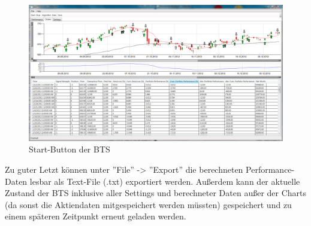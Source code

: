 \begin{figure}[H]
\centering
\includegraphics[width=1\textwidth]{images/btsorders.png}
\caption{Start-Button der \gls{BTS}}
\end{figure}

Zu guter Letzt können unter ''File'' -> ''Export'' die berechneten Performance-Daten lesbar als Text-File (.txt) exportiert werden. Außerdem kann der aktuelle Zustand der \gls{BTS} inklusive aller Settings und berechneter Daten außer der Charts (da sonst die Aktiendaten mitgespeichert werden müssten) gespeichert und zu einem späteren Zeitpunkt erneut geladen werden.